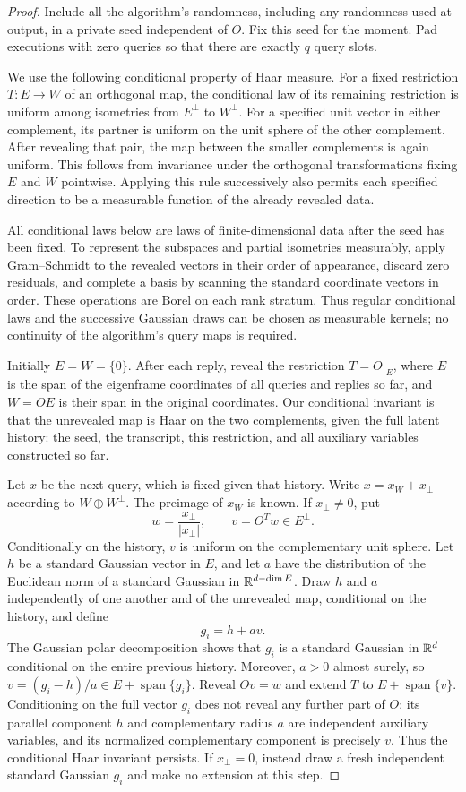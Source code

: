 \begin{proof}
Include all the algorithm's randomness, including any randomness used at
output, in a private seed independent of $O$. Fix this seed for the
moment. Pad executions with zero queries so that there are exactly $q$
query slots.

We use the following conditional property of Haar measure. For a fixed
restriction $T:E\to W$ of an orthogonal map, the conditional law of its
remaining restriction is uniform among isometries from $E^\perp$ to
$W^\perp$. For a specified unit vector in either complement, its partner
is uniform on the unit sphere of the other complement. After revealing
that pair, the map between the smaller complements is again uniform.
This follows from invariance under the orthogonal transformations fixing
$E$ and $W$ pointwise. Applying this rule successively also permits each
specified direction to be a measurable function of the already revealed
data.

All conditional laws below are laws of finite-dimensional data after the
seed has been fixed. To represent the subspaces and partial isometries
measurably, apply Gram--Schmidt to the revealed vectors in their order of
appearance, discard zero residuals, and complete a basis by scanning the
standard coordinate vectors in order. These operations are Borel on
each rank stratum. Thus regular conditional laws and the successive
Gaussian draws can be chosen as measurable kernels; no continuity of
the algorithm's query maps is required.

Initially $E=W=\{0\}$. After each reply, reveal the restriction
$T=O|_E$, where $E$ is the span of the eigenframe coordinates of all
queries and replies so far, and $W=OE$ is their span in the original
coordinates. Our conditional invariant is that the unrevealed map is
Haar on the two complements, given the full latent history: the seed,
the transcript, this restriction, and all auxiliary variables constructed
so far.

Let $x$ be the next query, which is fixed given that history. Write
$x=x_W+x_\perp$ according to $W\oplus W^\perp$. The preimage of $x_W$
is known. If $x_\perp\ne0$, put
\[
 w=\frac{x_\perp}{|x_\perp|},\qquad v=O^Tw\in E^\perp.
\]
Conditionally on the history, $v$ is uniform on the complementary unit
sphere. Let $h$ be a standard Gaussian vector in $E$, and let $a$ have
the distribution of the Euclidean norm of a standard Gaussian in
$\mathbb R^{d-\dim E}$. Draw $h$ and $a$ independently of one another and of
the unrevealed map, conditional on the history, and define
\[
                         g_i=h+av.
\]
The Gaussian polar decomposition shows that $g_i$ is a standard Gaussian
in $\mathbb R^d$ conditional on the entire previous history. Moreover, $a>0$ almost surely, so
$v=(g_i-h)/a\in E+\operatorname{span}\{g_i\}$. Reveal $Ov=w$ and extend $T$ to
$E+\operatorname{span}\{v\}$. Conditioning on the full vector $g_i$
does not reveal any further part of $O$: its parallel component $h$
and complementary radius $a$ are independent auxiliary variables, and
its normalized complementary component is precisely $v$. Thus the
conditional Haar invariant persists. If $x_\perp=0$, instead draw a fresh
independent standard Gaussian $g_i$ and make no extension at this step.


\end{proof}
